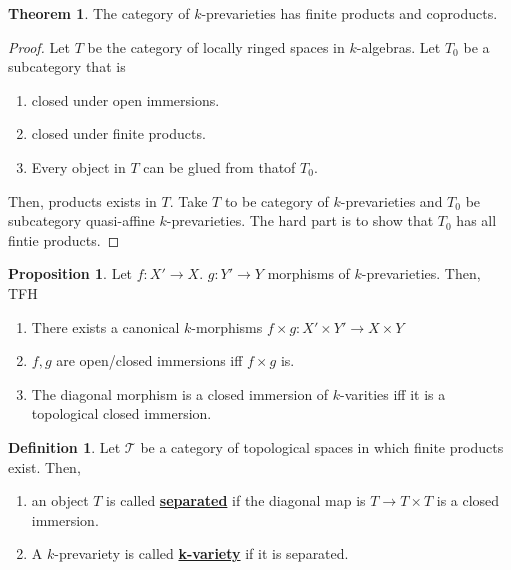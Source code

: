\documentclass{article}
\theoremstyle{definition}
\newtheorem{theorem}{Theorem}[section]
\theoremstyle{definition}
\newtheorem{definition}{Definition}[theorem]
\theoremstyle{definition}
\theoremstyle{definition}
\newtheorem{proposition}{Proposition}[theorem]
\theoremstyle{definition}
\theoremstyle{definition}
\theoremstyle{definition}
\begin{document}
\begin{tcolorbox}[colback=red!5!white,colframe=red!30!white]
    \begin{theorem}
    The category of $k$-prevarieties has finite products and coproducts.
    \end{theorem}
    \end{tcolorbox}
\begin{proof}
    Let $T$ be the category of locally ringed spaces in $k$-algebras. Let $T_0$ be a subcategory that is 
    \begin{enumerate}
        \item closed under open immersions.
        \item closed under finite products.
        \item Every object in $T$ can be glued from thatof $T_0$.
    \end{enumerate}
    Then, products exists in $T$. Take $T$ to be category of $k$-prevarieties and $T_0$ be subcategory quasi-affine $k$-prevarieties. The hard part is to show that $T_0$ has all fintie products. 
\end{proof}
    

\begin{tcolorbox}[colback=blue!5!white,colframe=blue!30!white]
\begin{proposition}
Let $f: X'\to X$. $g: Y'\to Y$ morphisms of $k$-prevarieties. Then, TFH
\begin{enumerate}
    \item There exists a canonical $k$-morphisms $f\times g: X'\times Y'\to X\times Y$
    \item $f,g$ are open/closed immersions iff $f\times g$ is.
    \item The diagonal morphism is a closed immersion of $k$-varities iff it is a topological closed immersion. 
\end{enumerate}
\end{proposition}
\end{tcolorbox}


\begin{tcolorbox}[colback=purple!5!white,colframe=purple!75!black]
\begin{definition}
Let $\mathcal{T}$ be a category of topological spaces in which finite products exist. Then, 
\begin{enumerate}
    \item an object $T$ is called \underline{\textbf{separated}} if the diagonal map is $T\to T\times T$ is a closed immersion.
    \item A $k$-prevariety is called \underline{\textbf{k-variety}} if it is separated.
\end{enumerate}
\end{definition}
\end{tcolorbox}
\end{document}
